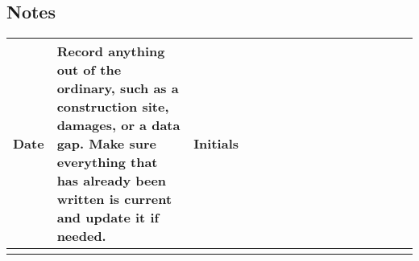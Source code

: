 \vspace{-5mm}
\subsection*{Notes}

\begin{table}[H]
    \label{table:Location and Data}
    \centering
    \footnotesize
    \begin{tabularx}{\textwidth}{@{} |X | p{10cm} |  X |@{}}
        \toprule
        Date  & Record anything out of the ordinary, such as a construction site, damages, or a data gap. Make sure everything that has already been written is current and update it if needed. & Initials \\
        \midrule
        & & &
        \midrule
        & & &
        \midrule
        & & &
        \midrule
        & & &
        \midrule
        & & &
        \bottomrule
    \end{tabularx}
\end{table}